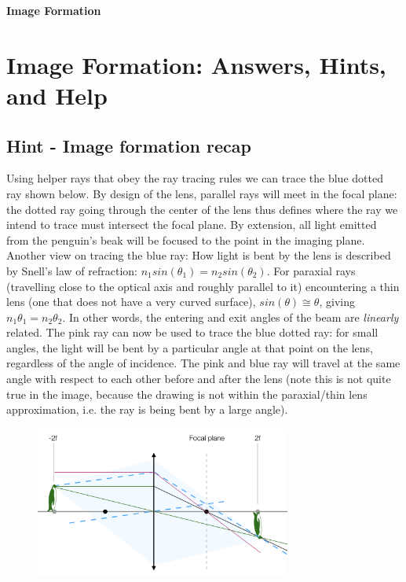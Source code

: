 \documentclass[a4paper]{report}
\begin{document}
	\setcounter{secnumdepth}{2}

	\begin{center}
		\textbf{\Large{Image Formation}}
	\end{center}


	\section{Image Formation: Answers, Hints, and Help}

    \subsection{Hint - Image formation recap}
	\hypertarget{hintTo-recap}{}
	Using helper rays that obey the ray tracing rules we can trace the blue dotted ray shown below.
	By design of the lens, parallel rays will meet in the focal plane: the dotted ray going through the center of the lens thus defines where the ray we intend to trace must intersect the focal plane.
	By extension, all light emitted from the penguin's beak will be focused to the point in the imaging plane.
	\\

	Another view on tracing the blue ray: How light is bent by the lens is described by Snell's law of refraction: $n_1 sin(\theta_1) = n_2 sin(\theta_2)$.
	For paraxial rays (travelling close to the optical axis and roughly parallel to it) encountering a thin lens (one that does not have a very curved surface), $sin(\theta)\cong\theta$, giving $n_1 \theta_1 = n_2 \theta_2$.
	In other words, the entering and exit angles of the beam are \emph{linearly} related.
	The pink ray can now be used to trace the blue dotted ray: for small angles, the light will be bent by a particular angle at that point on the lens, regardless of the angle of incidence.
	The pink and blue ray will travel at the same angle with respect to each other before and after the lens (note this is not quite true in the image, because the drawing is not within the paraxial/thin lens approximation, i.e. the ray is being bent by a large angle).

	\begin{figure}[h]
		\center
		\includegraphics[width=0.75\textwidth]{hint_ray_tracing.png}
		\label{hint_ray_tracing}
	\end{figure}
\end{document}
